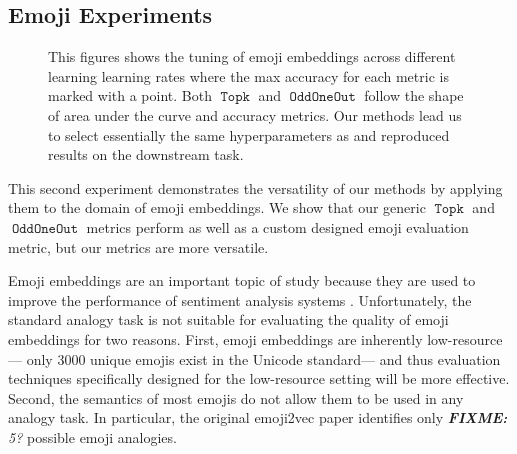 \documentclass[11pt,a4paper]{article}
\DeclareMathOperator{\OddOneOut}{\texttt{OddOneOut}}
\DeclareMathOperator{\topk}{\texttt{Topk}}
\newcommand{\fixme}[1]{{\color{red}\itshape \textbf{FIXME:} {#1}}}
\begin{document}
\subsection{Emoji Experiments}
\begin{figure}
\centering
\caption{This figures shows the tuning of emoji embeddings across different learning learning rates where the max accuracy for each metric is marked with a point.
 Both $\topk$ and $\OddOneOut$ follow the shape of \cite{eisner2016emoji2vec} area under the curve and accuracy metrics.
 Our methods lead us to select essentially the same hyperparameters as \cite{eisner2016emoji2vec} and reproduced results on the downstream task.}
\label{fig:emoji}
\end{figure}

This second experiment demonstrates the versatility of our methods by applying them to the domain of emoji embeddings.
We show that our generic $\topk$ and $\OddOneOut$ metrics perform as well as a custom designed emoji evaluation metric,
but our metrics are more versatile.

Emoji embeddings are an important topic of study because they are used to improve the performance of sentiment analysis systems \cite[e.g.][]{eisner2016emoji2vec,felbo2017using,barbieri2017emojis,ai2017untangling,wijeratne2017semantics,al2019smile}. 
Unfortunately,
the standard analogy task is not suitable for evaluating the quality of emoji embeddings for two reasons.
First, emoji embeddings are inherently low-resource---%
only 3000 unique emojis exist in the Unicode standard---%
and thus evaluation techniques specifically designed for the low-resource setting will be more effective.
Second, the semantics of most emojis do not allow them to be used in any analogy task.
In particular, the original emoji2vec paper \cite{eisner2016emoji2vec} identifies only \fixme{5?} possible emoji analogies.
\end{document}
